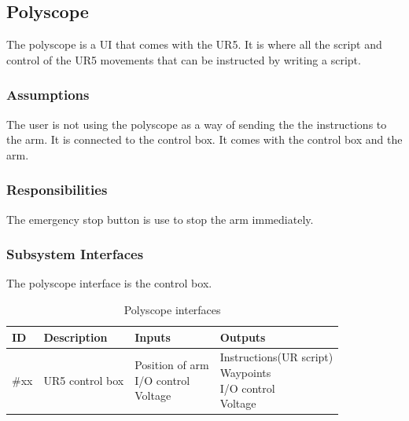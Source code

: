 \subsection{Polyscope}
The polyscope is a UI that comes with the UR5. It is where all the script and control of the UR5 movements that can be instructed by writing a script.

\subsubsection{Assumptions}
The user is not using the polyscope as a way of sending the the instructions to the arm.
It is connected to the control box.
It comes with the control box and the arm.

\subsubsection{Responsibilities}
The emergency stop button is use to stop the arm immediately.

\subsubsection{Subsystem Interfaces}
The polyscope interface is the control box.

\begin {table}[H]
\caption {Polyscope interfaces} 
\begin{center}
    \begin{tabular}{ | p{1cm} | p{6cm} | p{3cm} | p{3cm} |}
    \hline
    ID & Description & Inputs & Outputs \\ \hline
    \#xx & UR5 control box & \pbox{3cm}{Position of arm \\ I/O control\\ Voltage} & \pbox{3cm}{Instructions(UR script) \\ Waypoints \\ I/O control \\ Voltage}  \\ \hline
    \end{tabular}
\end{center}
\end{table}


